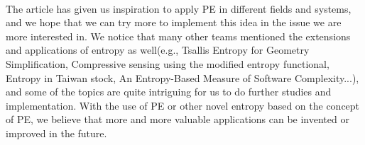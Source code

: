 \documentclass{article}
\begin{document}
\paragraph{}
The article has given us inspiration to apply PE in different fields and systems, and we hope that we can try more to implement this idea in the issue we are more interested in. We notice that many other teams mentioned the extensions and applications of entropy as well(e.g., Tsallis Entropy for Geometry Simplification, Compressive sensing using the modified entropy functional, Entropy in Taiwan stock, An Entropy-Based Measure of Software Complexity...), and some of the topics are quite intriguing for us to do further studies and implementation. With the use of PE or other novel entropy based on the concept of PE, we believe that more and more valuable applications can be invented or improved in the future.
 

\end{document}
